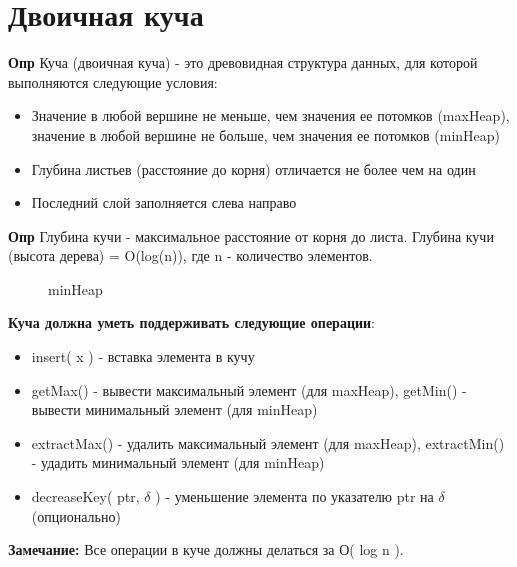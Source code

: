 \setcounter{section}{21}
\section{Двоичная куча}

\textbf{Опр} Куча (двоичная куча) - это древовидная структура данных, для которой выполняются следующие условия:
 ~~\begin{itemize}
        \item Значение в любой вершине не меньше, чем значения ее потомков (maxHeap), значение в любой вершине не больше, чем значения ее потомков (minHeap)
        \item Глубина листьев (расстояние до корня) отличается не более чем на один
        \item Последний слой заполняется слева направо
    \end{itemize}
    
\textbf{Опр} Глубина кучи - максимальное расстояние от корня до листа. Глубина кучи (высота дерева) = O(log(n)), где n - количество элементов.

\begin{figure}[h]
\caption {minHeap}
\label{ris:image}
\end{figure}
    
\textbf{ Куча должна уметь поддерживать следующие операции}:
    ~~\begin{itemize}
        \item insert( x ) - вставка элемента в кучу
        \item getMax() - вывести максимальный элемент (для maxHeap), getMin() - вывести минимальный элемент (для minHeap)
        \item extractMax() - удалить максимальный элемент (для maxHeap), extractMin() - удадить минимальный элемент (для minHeap)
        \item decreaseKey( ptr, $\delta$ ) - уменьшение элемента по указателю ptr на $\delta$ (опционально)
    \end{itemize}
    
\textbf{Замечание:} Все операции в куче должны делаться за О( log n ).

